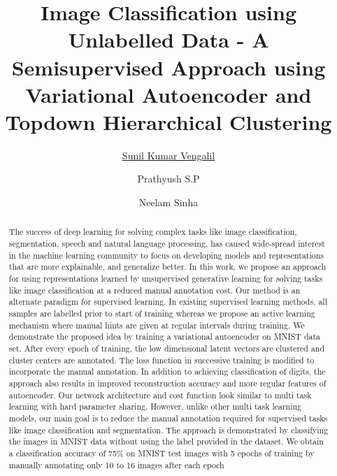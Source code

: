 \documentclass{uai2021} %
\title{Image Classification using Unlabelled Data - A Semisupervised Approach using Variational Autoencoder and Topdown Hierarchical Clustering}
\author[1]{\href{mailto:Sunil Kumar Vengalil <sunilkumar.vengalil@iiitb.org> ?Subject=Your UAI 2021 paper}{Sunil Kumar Vengalil}{}}
\author[2]{Prathyush S.P}
\author[1]{Neelam Sinha}
\affil[1]{%
    International Institute of Information Technology Bangalore\\
}
\affil[2]{%
    Worcester Polytechnic Institute \\
   100 Institute Rd, Worcester, MA 01609, United States
}
\begin{document}
\maketitle

\begin{abstract}
The success of deep learning for solving complex tasks like image classification, segmentation, speech and natural language processing, has caused wide-spread interest in the machine learning community to focus on developing models and representations that are more explainable, and generalize better.
In this work, we propose an approach for using representations learned by unsupervised generative learning for solving tasks like image classification at a reduced manual annotation cost.
Our method is an alternate paradigm for supervised learning.
In existing supervised learning methods,  all samples are labelled prior to start of training whereas we propose an active learning mechanism where manual hints are given at regular intervals during training.
We demonstrate the proposed idea by training a  variational autoencoder on MNIST data set.
After every epoch of training, the low dimensional latent vectors are clustered and cluster centers are annotated.
The loss function in successive training is modified to incorporate the manual annotation.
In addition to achieving classification of digits, the approach also results in improved reconstruction accuracy and more regular features of autoencoder.
Our network architecture and cost function look similar to multi task learning with hard parameter sharing.
However, unlike other multi task learning models, our main goal is to reduce the manual annotation required for supervised tasks like image classification and segmentation.
The approach is demonstrated by classifying the images in MNIST data without using the label provided in the dataset.
We obtain a classification accuracy of 75\% on MNIST test images with 5 epochs of training by manually annotating only 10 to 16 images after each epoch
\end{abstract}
\end{document}
